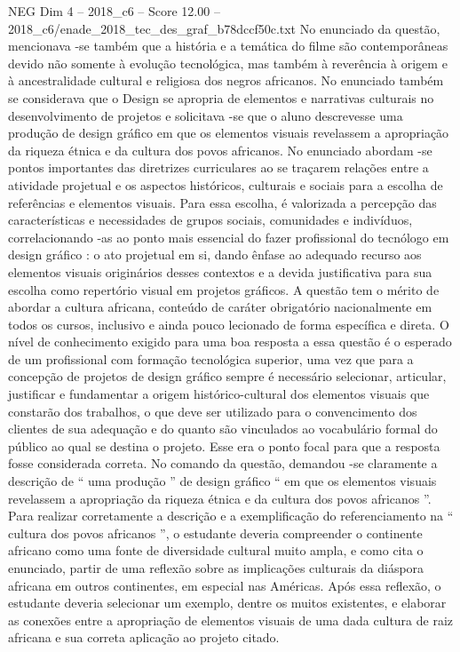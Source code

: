 \begin{textsample}{NEG Dim 4 – 2018\_c6 – Score 12.00 – 2018\_c6/enade\_2018\_tec\_des\_graf\_b78dccf50c.txt}
No enunciado da questão, mencionava -se também que a história e a temática do filme são contemporâneas devido não somente à evolução tecnológica, mas também à reverência à origem e à ancestralidade cultural e religiosa dos negros africanos.
No enunciado também se considerava que o Design se apropria de elementos e narrativas culturais no desenvolvimento de projetos e solicitava -se que o aluno descrevesse uma produção de design gráfico em que os elementos visuais revelassem a apropriação da riqueza étnica e da cultura dos povos africanos.
No enunciado abordam -se pontos importantes das diretrizes curriculares ao se traçarem relações entre a atividade projetual e os aspectos históricos, culturais e sociais para a escolha de referências e elementos visuais.
Para essa escolha, é valorizada a percepção das características e necessidades de grupos sociais, comunidades e indivíduos, correlacionando -as ao ponto mais essencial do fazer profissional do tecnólogo em design gráfico : o ato projetual em si, dando ênfase ao adequado recurso aos elementos visuais originários desses contextos e a devida justificativa para sua escolha como repertório visual em projetos gráficos.
A questão tem o mérito de abordar a cultura africana, conteúdo de caráter obrigatório nacionalmente em todos os cursos, inclusivo e ainda pouco lecionado de forma específica e direta.
O nível de conhecimento exigido para uma boa resposta a essa questão é o esperado de um profissional com formação tecnológica superior, uma vez que para a concepção de projetos de design gráfico sempre é necessário selecionar, articular, justificar e fundamentar a origem histórico-cultural dos elementos visuais que constarão dos trabalhos, o que deve ser utilizado para o convencimento dos clientes de sua adequação e do quanto são vinculados ao vocabulário formal do público ao qual se destina o projeto.
Esse era o ponto focal para que a resposta fosse considerada correta.
No comando da questão, demandou -se claramente a descrição de “ uma produção ” de design gráfico “ em que os elementos visuais revelassem a apropriação da riqueza étnica e da cultura dos povos africanos ”.
Para realizar corretamente a descrição e a exemplificação do referenciamento na “ cultura dos povos africanos ”, o estudante deveria compreender o continente africano como uma fonte de diversidade cultural muito ampla, e como cita o enunciado, partir de uma reflexão sobre as implicações culturais da diáspora africana em outros continentes, em especial nas Américas.
Após essa reflexão, o estudante deveria selecionar um exemplo, dentre os muitos existentes, e elaborar as conexões entre a apropriação de elementos visuais de uma dada cultura de raiz africana e sua correta aplicação ao projeto citado.

\end{textsample}
